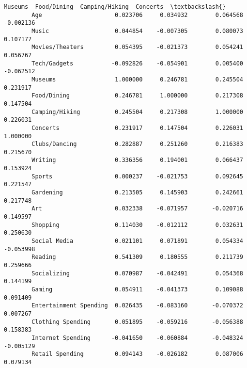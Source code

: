 \documentclass[11pt]{article}
\begin{document}
\begin{Verbatim}[commandchars=\\\{\}]
                                 Museums  Food/Dining  Camping/Hiking  Concerts  \textbackslash{}
        Age                     0.023706     0.034932        0.064568 -0.002136   
        Music                   0.044854    -0.007305        0.080073  0.107177   
        Movies/Theaters         0.054395    -0.021373        0.054241  0.056767   
        Tech/Gadgets           -0.092826    -0.054901        0.005400 -0.062512   
        Museums                 1.000000     0.246781        0.245504  0.231917   
        Food/Dining             0.246781     1.000000        0.217308  0.147504   
        Camping/Hiking          0.245504     0.217308        1.000000  0.226031   
        Concerts                0.231917     0.147504        0.226031  1.000000   
        Clubs/Dancing           0.282887     0.251260        0.216383  0.215670   
        Writing                 0.336356     0.194001        0.066437  0.153924   
        Sports                  0.000237    -0.021753        0.092645  0.221547   
        Gardening               0.213505     0.145903        0.242661  0.217748   
        Art                     0.032338    -0.071957       -0.020716  0.149597   
        Shopping                0.114030    -0.012112        0.032631  0.250630   
        Social Media            0.021101     0.071891        0.054334 -0.053998   
        Reading                 0.541309     0.180555        0.211739  0.259666   
        Socializing             0.070987    -0.042491        0.054368  0.144199   
        Gaming                  0.054911    -0.041373        0.109088  0.091409   
        Entertainment Spending  0.026435    -0.083160       -0.070372  0.007267   
        Clothing Spending       0.051895    -0.059216       -0.056388  0.158383   
        Internet Spending      -0.041650    -0.060884       -0.048324 -0.005129   
        Retail Spending         0.094143    -0.026182        0.087006  0.079134   
        

\end{Verbatim}
\end{document}
